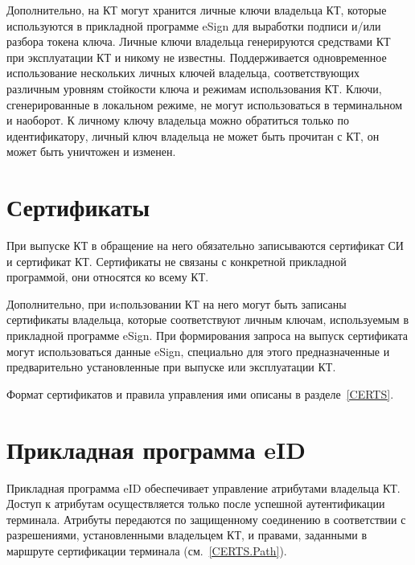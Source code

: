Дополнительно, на КТ могут хранится личные ключи владельца КТ, 
которые используются в прикладной программе eSign для выработки 
подписи и/или разбора токена ключа.
Личные ключи владельца генерируются средствами КТ при эксплуатации
КТ и никому не известны. 
Поддерживается одновременное 
использование нескольких личных ключей владельца, 
соответствующих различным уровням стойкости ключа и режимам
использования КТ.
Ключи, сгенерированные в локальном режиме, не могут использоваться 
в терминальном и наоборот.
К личному ключу владельца можно обратиться только по идентификатору, 
личный ключ владельца не может быть прочитан с КТ, 
он может быть уничтожен и изменен.

\section{Сертификаты}\label{OBJ.Certs}

При выпуске КТ в обращение на него обязательно записываются сертификат 
СИ и сертификат КТ. 
Сертификаты не связаны с конкретной 
прикладной программой, они относятся ко всему КТ. 

Дополнительно, при иcпользовании КТ на него могут быть записаны
сертификаты владельца, которые соответствуют личным ключам, используемым
в прикладной программе eSign.
При формирования запроса на выпуск сертификата могут использоваться
данные eSign, специально для этого предназначенные и предварительно
установленные при выпуске или эксплуатации КТ.


Формат сертификатов и правила управления ими описаны в разделе~\ref{CERTS}.

\section{Прикладная программа eID}\label{OBJ.eID}

Прикладная программа eID обеспечивает управление атрибутами владельца КТ. 
Доступ к атрибутам осуществляется только после успешной аутентификации 
терминала. Атрибуты передаются по защищенному соединению в соответствии с 
разрешениями, установленными владельцем КТ, и правами, заданными в маршруте 
сертификации терминала (см.~\ref{CERTS.Path}).  

